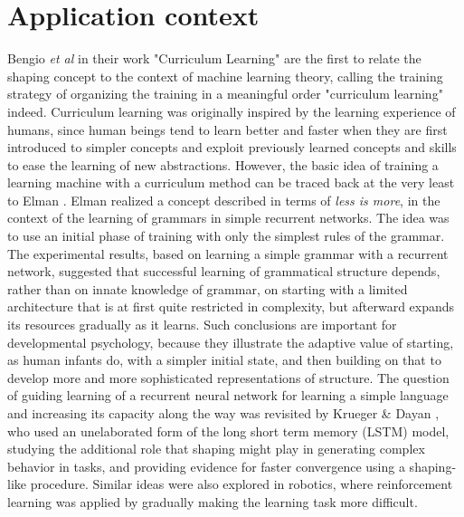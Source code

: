 \section{Application context}
Bengio \textit{et al} \cite{bengio2009curriculum} in their work "Curriculum Learning" are the first to relate the shaping concept
to the context of machine learning theory, calling the training strategy of organizing the training in a meaningful order "curriculum learning" indeed.
Curriculum learning was originally inspired by the learning experience of humans, since human beings tend to learn better and faster when 
they are first introduced to simpler concepts and exploit previously learned concepts and skills to ease the learning of new abstractions.
However, the basic idea of training a learning machine with a curriculum method can be traced back
at the very least to Elman \cite{Elman1}. Elman realized a concept described in terms of \textit{less is more}, in the context of the learning 
of grammars in simple recurrent networks. The idea was to use an initial phase of training with only the simplest rules of the grammar.
The experimental results, based on learning a simple grammar with a recurrent network, suggested that
successful learning of grammatical structure depends, rather than on innate knowledge of grammar,
on starting with a limited architecture that is at first quite restricted in complexity, but afterward expands its resources
gradually as it learns. Such conclusions are important for developmental psychology, because they 
illustrate the adaptive value of starting, as human infants do, with a simpler initial state, and then building on that to develop
more and more sophisticated representations of structure. The question of guiding learning of a recurrent neural network for learning
a simple language and increasing its capacity along the way was revisited by Krueger \& Dayan \cite{krueger2009},
who used an unelaborated form of the 
long short term memory (LSTM) model, studying
the additional role that shaping might play in generating complex behavior in tasks, and providing
evidence for faster convergence using a shaping-like procedure. Similar ideas were also explored
in robotics, where reinforcement learning was applied by gradually making the learning task more difficult.

